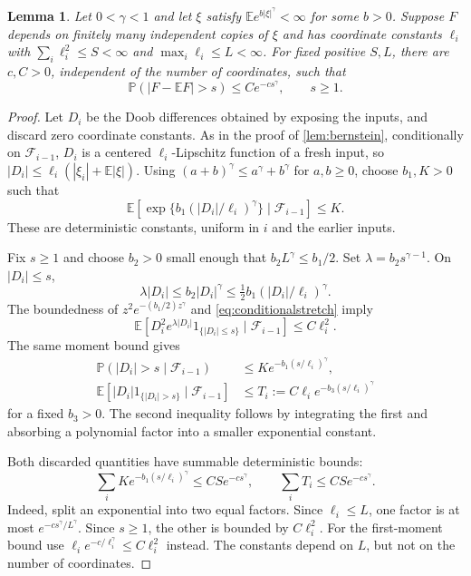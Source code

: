 \documentclass[11pt]{amsart}
\newtheorem{lemma}[theorem]{Lemma}
\theoremstyle{remark}
\newcommand{\Pp}{\mathbb P}
\newcommand{\E}{\mathbb E}
\newcommand{\ind}{\mathrm{1}}
\begin{document}
\begin{lemma}\label{lem:stretchedconcentration}
Let $0<\gamma<1$ and let $\xi$ satisfy $\E e^{b|\xi|^\gamma}<\infty$
for some $b>0$. Suppose $F$ depends on finitely many independent copies
of $\xi$ and has coordinate constants $\ell_i$ with
$\sum_i\ell_i^2\le S<\infty$ and $\max_i\ell_i\le L<\infty$.
For fixed positive $S,L$, there are $c,C>0$, independent of the number
of coordinates, such that
\begin{equation}\label{eq:stretchedconcentration}
 \Pp(|F-\E F|>s)\le Ce^{-cs^\gamma},\qquad s\ge1.
\end{equation}
\end{lemma}

\begin{proof}
Let $D_i$ be the Doob differences obtained by exposing the inputs, and
discard zero coordinate constants. As in the proof of
\cref{lem:bernstein}, conditionally on $\mathcal F_{i-1}$,
$D_i$ is a centered $\ell_i$-Lipschitz function of a fresh input, so
$|D_i|\le\ell_i(|\xi_i|+\E|\xi|)$.
Using $(a+b)^\gamma\le a^\gamma+b^\gamma$ for $a,b\ge0$, choose
$b_1,K>0$ such that
\begin{equation}\label{eq:conditionalstretch}
 \E\left[\exp\{b_1(|D_i|/\ell_i)^\gamma\}
       \mid\mathcal F_{i-1}\right]\le K.
\end{equation}
These are deterministic constants, uniform in $i$ and the earlier inputs.

Fix $s\ge1$ and choose $b_2>0$ small enough that
$b_2 L^\gamma\le b_1/2$. Set $\lambda=b_2s^{\gamma-1}$.
On $|D_i|\le s$,
\[
 \lambda|D_i|\le b_2|D_i|^\gamma
 \le\tfrac12 b_1(|D_i|/\ell_i)^\gamma.
\]
The boundedness of $z^2e^{-(b_1/2)z^\gamma}$ and
\eqref{eq:conditionalstretch} imply
\begin{equation}\label{eq:truncatedsecond}
 \E[D_i^2e^{\lambda|D_i|}\ind_{\{|D_i|\le s\}}
            \mid\mathcal F_{i-1}]\le C\ell_i^2.
\end{equation}
The same moment bound gives
\begin{align*}
 \Pp(|D_i|>s\mid\mathcal F_{i-1})
   &\le K e^{-b_1(s/\ell_i)^\gamma},\\
 \E[|D_i|\ind_{\{|D_i|>s\}}\mid\mathcal F_{i-1}]
   &\le T_i:=C\ell_i e^{-b_3(s/\ell_i)^\gamma}
\end{align*}
for a fixed $b_3>0$. The second inequality follows by integrating the
first and absorbing a polynomial factor into a smaller exponential
constant.

Both discarded quantities have summable deterministic bounds:
\begin{equation}\label{eq:discarded}
 \sum_iK e^{-b_1(s/\ell_i)^\gamma}\le CS e^{-cs^\gamma},
 \qquad \sum_iT_i\le CS e^{-cs^\gamma}.
\end{equation}
Indeed, split an exponential into two equal factors. Since $\ell_i\le L$,
one factor is at most $e^{-c s^\gamma/L^\gamma}$. Since $s\ge1$, the
other is bounded by $C\ell_i^2$. For the first-moment bound use
$\ell_i e^{-c/\ell_i^\gamma}\le C\ell_i^2$ instead. The constants
depend on $L$, but not on the number of coordinates.


\end{proof}
\end{document}
